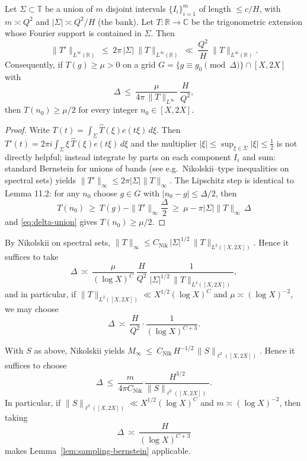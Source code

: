 \begin{lemma}\label{lem:union-bands-bernstein}
Let $\Sigma\subset\mathbb T$ be a union of $m$ disjoint intervals $\{I_i\}_{i=1}^m$ of length $\le c/H$, with $m\asymp Q^2$ and $|\Sigma|\asymp Q^2/H$ (the bank).
Let $T:\mathbb R\to\mathbb C$ be the trigonometric extension whose Fourier support is contained in $\Sigma$.
Then
\begin{equation}\label{eq:bernstein-union}
\|T'\|_{L^\infty(\mathbb R)}\ \le\ 2\pi\,|\Sigma|\ \|T\|_{L^\infty(\mathbb R)}
\ \ll\ \frac{Q^2}{H}\ \|T\|_{L^\infty(\mathbb R)}.
\end{equation}
Consequently, if $T(g)\ge \mu>0$ on a grid $G=\{g\equiv g_0\!\!\pmod{\Delta}\}\cap[X,2X]$ with
\begin{equation}\label{eq:delta-union}
\Delta\ \le\ \frac{\mu}{4\pi\,\|T\|_{L^\infty}}\ \frac{H}{Q^2},
\end{equation}
then $T(n_0)\ge \mu/2$ for every integer $n_0\in[X,2X]$.
\end{lemma}

\begin{proof}
Write $T(t)=\int_\Sigma \widehat T(\xi)e(t\xi)\,d\xi$. Then 
$T'(t)=2\pi i\int_\Sigma \xi\,\widehat T(\xi)e(t\xi)\,d\xi$ and the multiplier $|\xi|\le \sup_{\xi\in\Sigma}|\xi|\le \tfrac12$ is not directly helpful; instead integrate by parts on each component $I_i$ and sum: standard Bernstein for unions of bands (see e.g.\ Nikolskii–type inequalities on spectral sets) yields $\|T'\|_\infty \le 2\pi|\Sigma|\|T\|_\infty$. The Lipschitz step is identical to Lemma 11.2: for any $n_0$ choose $g\in G$ with $|n_0-g|\le \Delta/2$, then
\[
T(n_0)\ \ge\ T(g)-\|T'\|_\infty\frac{\Delta}{2}\ \ge\ \mu - \pi|\Sigma|\|T\|_\infty\,\Delta
\]
and \eqref{eq:delta-union} gives $T(n_0)\ge \mu/2$.
\end{proof}

\begin{corollary}\label{cor:union-grid}
By Nikolskii on spectral sets, $\|T\|_\infty \le C_{\mathrm{Nik}}\,|\Sigma|^{1/2}\,\|T\|_{L^2([X,2X])}$. 
Hence it suffices to take
\[
\Delta\ \asymp\ \frac{\mu}{(\log X)^{C}}\ \frac{H}{Q^2}\ \frac{1}{|\Sigma|^{1/2}\,\|T\|_{L^2([X,2X])}},
\]
and in particular, if $\|T\|_{L^2([X,2X])}\ll X^{1/2}(\log X)^C$ and $\mu\asymp(\log X)^{-2}$, we may choose
\[
\Delta\ \asymp\ \frac{H}{Q^2}\cdot \frac{1}{(\log X)^{C+3}}.
\]
\end{corollary}

\begin{corollary}\label{cor:nikolskii-grid}
With $S$ as above, Nikolskii yields $M_\infty\ \le\ C_{\mathrm{Nik}}\,H^{-1/2}\,\|S\|_{\ell^2([X,2X])}$.
Hence it suffices to choose
\[
\Delta\ \le\ \frac{m}{4\pi C_{\mathrm{Nik}}}\,\frac{H^{3/2}}{\|S\|_{\ell^2([X,2X])}}.
\]
In particular, if $\|S\|_{\ell^2([X,2X])}\ll X^{1/2}(\log X)^C$ and $m\asymp (\log X)^{-2}$, then taking
\[
\Delta\ \asymp\ \frac{H}{(\log X)^{C+3}}
\]
makes Lemma~\ref{lem:sampling-bernstein} applicable.
\end{corollary}

